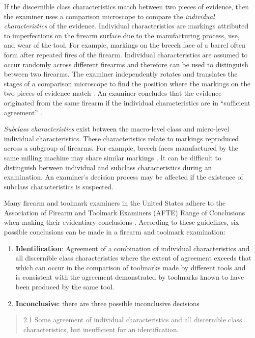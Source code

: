 \documentclass[11pt,]{isuthesis}
\begin{document}
If the discernible class characteristics match between two pieces of evidence, then the examiner uses a comparison microscope to compare the \emph{individual characteristics} of the evidence.
Individual characteristics are markings attributed to imperfections on the firearm surface due to the manufacturing process, use, and wear of the tool.
For example, markings on the breech face of a barrel often form after repeated fires of the firearm.
Individual characteristics are assumed to occur randomly across different firearms and therefore can be used to distinguish between two firearms.
The examiner independently rotates and translates the stages of a comparison microscope to find the position where the markings on the two pieces of evidence match \citep{Zheng2014}.
An examiner concludes that the evidence originated from the same firearm if the individual characteristics are in ``sufficient agreement'' \citep{AFTE1992}.

\emph{Subclass characteristics} exist between the macro-level class and micro-level individual characteristics.
These characteristics relate to markings reproduced across a subgroup of firearms.
For example, breech faces manufactured by the same milling machine may share similar markings \citep{firearmManufacturing}.
It can be difficult to distinguish between individual and subclass characteristics during an examination.
An examiner's decision process may be affected if the existence of subclass characteristics is suspected.

Many firearm and toolmark examiners in the United States adhere to the Association of Firearm and Toolmark Examiners (AFTE) Range of Conclusions when making their evidentiary conclusions \citep{AFTE1992}.
According to these guidelines, six possible conclusions can be made in a firearm and toolmark examination:

\begin{enumerate}
\def\labelenumi{\arabic{enumi}.}
\item
  \textbf{Identification}: Agreement of a combination of individual characteristics and all discernible class characteristics where the extent of agreement exceeds that which can occur in the comparison of toolmarks made by different tools and is consistent with the agreement demonstrated by toolmarks known to have been produced by the same tool.
\item
  \textbf{Inconclusive}: there are three possible inconclusive decisions
\end{enumerate}

\begin{quote}
2.1 Some agreement of individual characteristics and all discernible class characteristics, but insufficient for an identification.
\end{quote}
\end{document}

